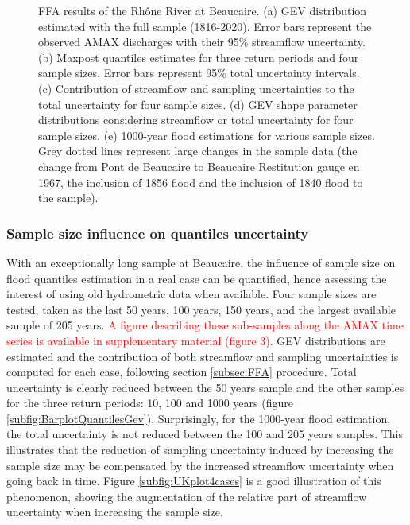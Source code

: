 \documentclass[11pt]{article}
\begin{document}
\begin{figure}[p]
            
        \caption{FFA results of the Rhône River at Beaucaire. (a) GEV distribution estimated with the full sample (1816-2020). Error bars represent the observed AMAX discharges with their 95\% streamflow uncertainty.
        (b) Maxpost quantiles estimates for three return periods and four sample sizes. Error bars represent 95\% total uncertainty intervals.
        (c) Contribution of streamflow and sampling uncertainties to the total uncertainty for four sample sizes. 
        (d) GEV shape parameter distributions considering streamflow or total uncertainty for four sample sizes. 
        (e) 1000-year flood estimations for various sample sizes. Grey dotted lines represent large changes in the sample data (the change from Pont de Beaucaire to Beaucaire Restitution gauge en 1967, the inclusion of 1856 flood and the inclusion of 1840 flood to the sample).}
        \label{fig:Quantiles}
        \end{figure}

        \subsubsection{Sample size influence on quantiles uncertainty}
        \label{subsec:SampleSize}
        
        With an exceptionally long sample at Beaucaire, the influence of sample size on flood quantiles estimation in a real case can be quantified, hence assessing the interest of using old hydrometric data when available. Four sample sizes are tested, taken as the last 50 years, 100 years, 150 years, and the largest available sample of 205 years. \textcolor{red}{A figure describing these sub-samples along the AMAX time series is available in supplementary material (figure 3).} GEV distributions are estimated and the contribution of both streamflow and sampling uncertainties is computed for each case, following section \ref{subsec:FFA} procedure. Total uncertainty is clearly reduced between the 50 years sample and the other samples for the three return periods: 10, 100 and 1000 years (figure \ref{subfig:BarplotQuantilesGev}). Surprisingly, for the 1000-year flood estimation, the total uncertainty is not reduced between the 100 and 205 years samples. This illustrates that the reduction of sampling uncertainty induced by increasing the sample size may be compensated by the increased streamflow uncertainty when going back in time. Figure \ref{subfig:UKplot4cases} is a good illustration of this phenomenon, showing the augmentation of the relative part of streamflow uncertainty when increasing the sample size.
        
\end{document}
